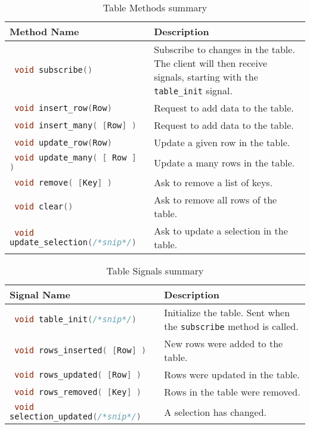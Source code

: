 \documentclass[11pt, oneside]{amsart}
\begin{document}
\begin{table}
	\begin{tabularx}{.9\textwidth}{p{2.25in}X}
		\toprule
		Method Name & Description \\
		\midrule
		\lstinline[language=c++]| void subscribe() | 
		& 
		Subscribe to changes in the table. The client will then receive signals, starting with the \texttt{table\_init} signal.
		\\
		\lstinline[language=c++]| void insert_row(Row) | 
		&
		Request to add data to the table.
		\\
		\lstinline[language=c++]| void insert_many( [Row] ) | 
		&
		Request to add data to the table.
		\\
		\lstinline[language=c++]| void update_row(Row) | 
		& 
		Update a given row in the table.
		\\
		\lstinline[language=c++]| void update_many( [ Row ]  ) | 
		& 
		Update a many rows in the table.
		\\
		\lstinline[language=c++]| void remove( [Key] ) | 
		& 
		Ask to remove a list of keys.
		\\
		\lstinline[language=c++]| void clear() | 
		& 
		Ask to remove all rows of the table.
		\\
		\lstinline[language=c++]| void update_selection(/*snip*/) | 
		& 
		Ask to update a selection in the table.
		\\
		\bottomrule
	\end{tabularx}	
	\caption{Table Methods summary}
	\label{tbl:table_methods}
\end{table}

\begin{table}
	\begin{tabularx}{.9\textwidth}{p{2.25in}X}
		\toprule
		Signal Name & Description \\
		\midrule
		\lstinline[language=c++]| void table_init(/*snip*/) | 
		& 
		Initialize the table. Sent when the \texttt{subscribe} method is called.
		\\
		\lstinline[language=c++]| void rows_inserted( [Row] ) | 
		&
		New rows were added to the table.
		\\
		\lstinline[language=c++]| void rows_updated( [Row] ) | 
		&
		Rows were updated in the table.
		\\
		\lstinline[language=c++]| void rows_removed( [Key] ) | 
		&
		Rows in the table were removed.
		\\
		\lstinline[language=c++]| void selection_updated(/*snip*/) | 
		&
		A selection has changed.
		\\
		\bottomrule
	\end{tabularx}	
	\caption{Table Signals summary}
	\label{tbl:table_signals}
\end{table}
\end{document}

